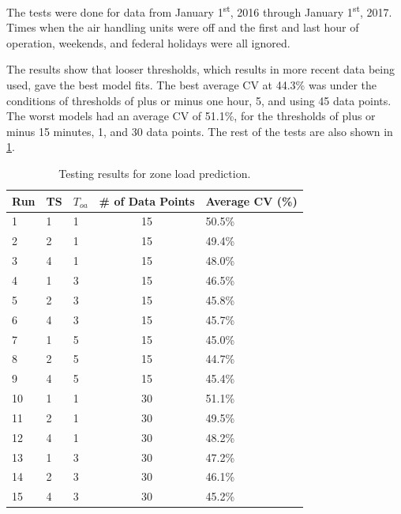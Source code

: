 The tests were done for data from January 1\textsuperscript{st}, 2016
through January 1\textsuperscript{st}, 2017. Times when the air handling
units were off and the first and last hour of operation, weekends,  and
federal holidays were all ignored. 

The results show that looser thresholds, which results in more recent
data being used, gave the best model fits. The best average CV at 44.3\%
was under the conditions of thresholds of plus or minus one hour,
\SI{5}{\degF}, and using 45 data points. The worst models had an average
CV of 51.1\%, for the thresholds of plus or minus 15 minutes,
\SI{1}{\degF}, and 30 data points. The rest of the tests are also shown
in \tableref{} \ref{tab:ZoneLoadTestingResults}.


\begin{table}
\centering
\caption{Testing results for zone load prediction.}
\label{tab:ZoneLoadTestingResults}
\begin{tabular}{@{}lllcl@{}}
\toprule
Run & TS & \(T_{oa} \) & \# of Data Points & Average CV (\%) \\ \midrule
1   & 1  & 1           & 15                & 50.5\%          \\
2   & 2  & 1           & 15                & 49.4\%          \\
3   & 4  & 1           & 15                & 48.0\%          \\
4   & 1  & 3           & 15                & 46.5\%          \\
5   & 2  & 3           & 15                & 45.8\%          \\
6   & 4  & 3           & 15                & 45.7\%          \\
7   & 1  & 5           & 15                & 45.0\%          \\
8   & 2  & 5           & 15                & 44.7\%          \\
9   & 4  & 5           & 15                & 45.4\%          \\
10  & 1  & 1           & 30                & 51.1\%          \\
11  & 2  & 1           & 30                & 49.5\%          \\
12  & 4  & 1           & 30                & 48.2\%          \\
13  & 1  & 3           & 30                & 47.2\%          \\
14  & 2  & 3           & 30                & 46.1\%          \\
15  & 4  & 3           & 30                & 45.2\%          \\

\end{tabular}
\end{table}
